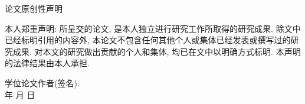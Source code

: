 {\pagestyle{empty}
\newpage
\vspace*{20pt}
\begin{center}{\heiti 论文原创性声明}\end{center}
\par\vspace*{30pt}
\renewcommand{\baselinestretch}{2}
{ \songti %


本人郑重声明: 所呈交的论文, 是本人独立进行研究工作所取得的研究成果.
除文中已经标明引用的内容外, 本论文不包含任何其他个人或集体已经发表或撰写过的研究成果.
对本文的研究做出贡献的个人和集体, 均已在文中以明确方式标明. 本声明的法律结果由本人承担.


\vskip2cm

\hspace*{4cm}学位论文作者(签名): \hspace{4cm} \hfill \\[1cm]
\hspace*{10cm}年 \hfill  月 \hfill 日\hspace{1cm}\hfill\par}

  \iflib
  \else
  \newpage
  \cleardoublepage
  \fi
}
\renewcommand{\baselinestretch}{1.6}
\small\normalsize




